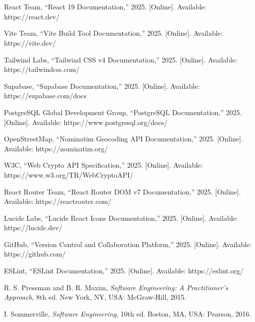 \documentclass[12pt,a4paper]{report}
\makeatletter
\renewenvironment{thebibliography}[1]
{\section*{}\@mkboth{}{}%
\list{\@biblabel{\@arabic\c@enumiv}}%
{\settowidth\labelwidth{\@biblabel{#1}}%

\leftmargin\labelwidth
\advance\leftmargin\labelsep
\itemsep=0.6\baselineskip
\usecounter{enumiv}%
\let\p@enumiv\@empty
\renewcommand\theenumiv{\@arabic\c@enumiv}}%
\sloppy}
{\endlist}
\makeatother
\begin{document}

\setcounter{chapter}{9}
\clearpage
\thispagestyle{empty}

\noindent
{}

\clearpage
{}

\setcounter{section}{0}

\begin{thebibliography}{10}

React Team, ``React 19 Documentation,'' 2025.
[Online]. Available: https://react.dev/

Vite Team, ``Vite Build Tool Documentation,'' 2025.
[Online]. Available: https://vite.dev/

Tailwind Labs, ``Tailwind CSS v4 Documentation,'' 2025.
[Online]. Available: https://tailwindcss.com/

Supabase, ``Supabase Documentation,'' 2025.
[Online]. Available: https://supabase.com/docs

PostgreSQL Global Development Group, ``PostgreSQL Documentation,'' 2025.
[Online]. Available: https://www.postgresql.org/docs/

OpenStreetMap, ``Nominatim Geocoding API Documentation,'' 2025.
[Online]. Available: https://nominatim.org/

W3C, ``Web Crypto API Specification,'' 2025.
[Online]. Available: https://www.w3.org/TR/WebCryptoAPI/

React Router Team, ``React Router DOM v7 Documentation,'' 2025.
[Online]. Available: https://reactrouter.com/

Lucide Labs, ``Lucide React Icons Documentation,'' 2025.
[Online]. Available: https://lucide.dev/

GitHub, ``Version Control and Collaboration Platform,'' 2025.
[Online]. Available: https://github.com/

ESLint, ``ESLint Documentation,'' 2025.
[Online]. Available: https://eslint.org/

R. S. Pressman and B. R. Maxim, \textit{Software Engineering: A Practitioner's Approach}, 8th ed.
New York, NY, USA: McGraw-Hill, 2015.

I. Sommerville, \textit{Software Engineering}, 10th ed.
Boston, MA, USA: Pearson, 2016.

\end{thebibliography}
\end{document}
